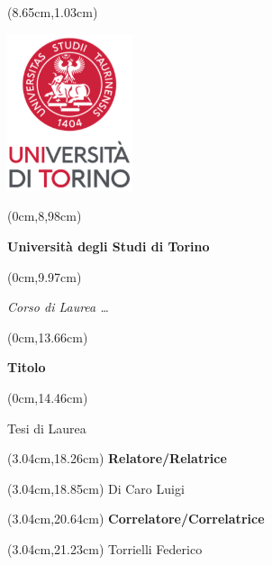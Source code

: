 \frontmatter

\thispagestyle{empty}

\begingroup
\TahomaFont


\begin{textblock*}{4cm}(8.65cm,1.03cm)
	\centerline {\includegraphics[width=3.67cm]{res/LogoUniToConvertito.png}}
\end{textblock*}


\begin{textblock*}{21cm}(0cm,8,98cm)
	\fontsize{18}{22}\selectfont
	\centerline {\textbf{ Universit\`a degli Studi di Torino}}
\end{textblock*}
\begin{textblock*}{21cm}(0cm,9.97cm)
	\fontsize{18}{22}\selectfont
	\centerline {\textit{Corso di Laurea \dots}}
\end{textblock*}


\begin{textblock*}{21cm}(0cm,13.66cm)
	\fontsize{20}{24}\selectfont
	\centerline  {\textbf{Titolo}}
\end{textblock*}
\begin{textblock*}{21cm}(0cm,14.46cm)
	\fontsize{18}{22}\selectfont
	\centerline{\Large {Tesi di Laurea}}
\end{textblock*}



\fontsize{14}{17}\selectfont

\begin{textblock*}{8cm}(3.04cm,18.26cm)
	\noindent
	\textbf{Relatore/Relatrice}
\end{textblock*}
\begin{textblock*}{8cm}(3.04cm,18.85cm)
	\noindent
	Di Caro Luigi
\end{textblock*}

\begin{textblock*}{8cm}(3.04cm,20.64cm)
	\noindent
	\textbf{Correlatore/Correlatrice}
\end{textblock*}
\begin{textblock*}{8cm}(3.04cm,21.23cm)
	\noindent
	Torrielli Federico
\end{textblock*}


